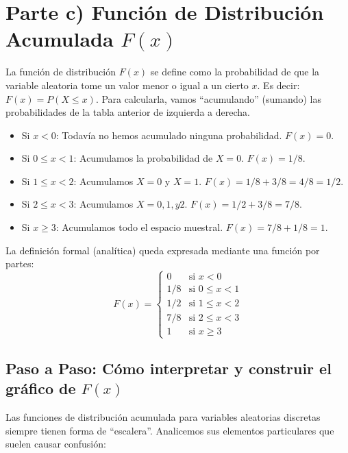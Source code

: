 \documentclass[11pt, a4paper]{article}
\begin{document}
\newpage

\section*{Parte c) Función de Distribución Acumulada $F(x)$}

La función de distribución $F(x)$ se define como la probabilidad de que la variable aleatoria tome un valor menor o igual a un cierto $x$. Es decir: $F(x) = P(X \le x)$. Para calcularla, vamos ``acumulando'' (sumando) las probabilidades de la tabla anterior de izquierda a derecha.

\begin{itemize}
    \item Si $x < 0$: Todavía no hemos acumulado ninguna probabilidad. $F(x) = 0$.
    \item Si $0 \le x < 1$: Acumulamos la probabilidad de $X=0$. $F(x) = 1/8$.
    \item Si $1 \le x < 2$: Acumulamos $X=0$ y $X=1$. $F(x) = 1/8 + 3/8 = 4/8 = 1/2$.
    \item Si $2 \le x < 3$: Acumulamos $X=0, 1, y 2$. $F(x) = 1/2 + 3/8 = 7/8$.
    \item Si $x \ge 3$: Acumulamos todo el espacio muestral. $F(x) = 7/8 + 1/8 = 1$.
\end{itemize}

La definición formal (analítica) queda expresada mediante una función por partes:
\[
F(x) = 
\begin{cases} 
0 & \text{si } x < 0 \\
1/8 & \text{si } 0 \le x < 1 \\
1/2 & \text{si } 1 \le x < 2 \\
7/8 & \text{si } 2 \le x < 3 \\
1 & \text{si } x \ge 3 
\end{cases}
\]

\subsection*{Paso a Paso: Cómo interpretar y construir el gráfico de $F(x)$}

Las funciones de distribución acumulada para variables aleatorias discretas siempre tienen forma de ``escalera''. Analicemos sus elementos particulares que suelen causar confusión:
\end{document}
